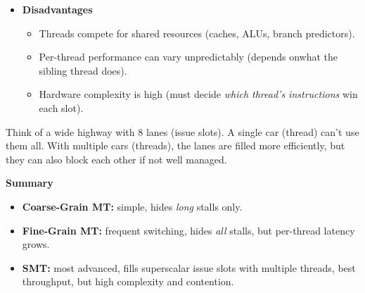 \begin{itemize}
\begin{itemize}
        \item[\textcolor{Red2}{\faIcon{times-circle}}] \textcolor{Red2}{\textbf{Disadvantages}}
        \begin{itemize}
            \item[\textcolor{Red2}{\faIcon{times}}] Threads compete for shared resources (caches, ALUs, branch predictors).
            \item[\textcolor{Red2}{\faIcon{times}}] Per-thread performance can vary unpredictably (depends on\break what the sibling thread does).
            \item[\textcolor{Red2}{\faIcon{times}}] Hardware complexity is high (must decide \emph{which thread's instructions} win each slot).
        \end{itemize}
    \end{itemize}

    \begin{examplebox}
        Think of a wide highway with 8 lanes (issue slots). A single car (thread) can't use them all. With multiple cars (threads), the lanes are filled more efficiently, but they can also block each other if not well managed.
    \end{examplebox}
\end{itemize}

\highspace
\begin{flushleft}
    \textcolor{Green3}{ \textbf{Summary}}
\end{flushleft}
\begin{itemize}
    \item \textbf{Coarse-Grain MT:} simple, hides \emph{long} stalls only.
    \item \textbf{Fine-Grain MT:} frequent switching, hides \emph{all} stalls, but per-thread latency grows.
    \item \textbf{SMT:} most advanced, fills superscalar issue slots with multiple threads, best throughput, but high complexity and contention.
\end{itemize}